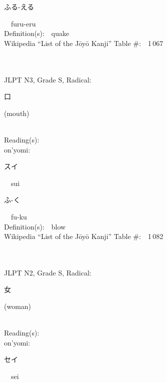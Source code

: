 \begin{multicols}{2}
{\hspace*{2em}}{\begin{CJK}{UTF8}{min} ふる-える \end{CJK}}\ \ furu-eru\ \ \\
Definition(s):\ \ quake \\
Wikipedia ``List of the J\=oy\=o Kanji'' Table \#:\ \ 1\,067 \\
\ \ \\
{\fontsize{34pt}{40pt}  }\ \ \\  %
{JLPT N3, Grade S, Radical:\ \ {\begin{CJK}{UTF8}{min} 口 \end{CJK}} (mouth) } \\
Reading(s):\ \ \\
{\hspace*{1em}}on'yomi:\ \ \\
{\hspace*{2em}}{\begin{CJK}{UTF8}{min} スイ \end{CJK}}\ \ sui\ \ \\
{\hspace*{2em}}{\begin{CJK}{UTF8}{min} ふ-く \end{CJK}}\ \ fu-ku\ \ \\
Definition(s):\ \ blow \\
Wikipedia ``List of the J\=oy\=o Kanji'' Table \#:\ \ 1\,082 \\
\ \ \\
{\fontsize{34pt}{40pt}  }\ \ \\  %
{JLPT N2, Grade S, Radical:\ \ {\begin{CJK}{UTF8}{min} 女 \end{CJK}} (woman) } \\
Reading(s):\ \ \\
{\hspace*{1em}}on'yomi:\ \ \\
{\hspace*{2em}}{\begin{CJK}{UTF8}{min} セイ \end{CJK}}\ \ sei\ \ \\

\end{multicols}
